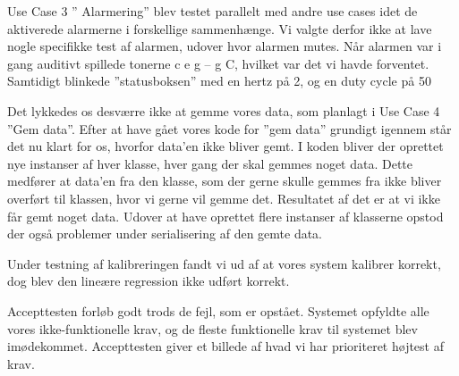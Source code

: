 Use Case 3 ” Alarmering” blev testet parallelt med andre use cases idet de aktiverede alarmerne i forskellige sammenhænge. Vi valgte derfor ikke at lave nogle specifikke test af alarmen, udover hvor alarmen mutes. Når alarmen var i gang auditivt spillede tonerne c e g – g C, hvilket var det vi havde forventet. Samtidigt blinkede ”statusboksen” med en hertz på 2, og en duty cycle på 50%

Det lykkedes os desværre ikke at gemme vores data, som planlagt i Use Case 4 ”Gem data”. Efter at have gået vores kode for ”gem data” grundigt igennem står det nu klart for os, hvorfor data’en ikke bliver gemt. I koden bliver der oprettet nye instanser af hver klasse, hver gang der skal gemmes noget data. Dette medfører at data’en fra den klasse, som der gerne skulle gemmes fra ikke bliver overført til klassen, hvor vi gerne vil gemme det. Resultatet af det er at vi ikke får gemt noget data.
Udover at have oprettet flere instanser af klasserne opstod der også problemer under serialisering af den gemte data. 

Under testning af kalibreringen fandt vi ud af at vores system kalibrer korrekt, dog blev den lineære regression ikke udført korrekt.

Accepttesten forløb godt trods de fejl, som er opstået. Systemet opfyldte alle vores ikke-funktionelle krav, og de fleste funktionelle krav til systemet blev imødekommet. Accepttesten giver et billede af hvad vi har prioriteret højtest af krav.
